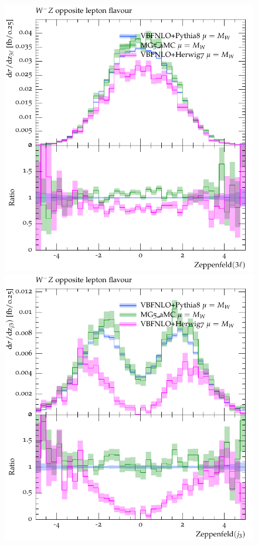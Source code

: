 \documentclass[11pt]{cernrep}
\begin{document}
\begin{figure}[htbp]
\begin{center}
   \includegraphics[scale=0.5]{figs/VBFNLO_WmZ_OF_zep3l}
   \includegraphics[scale=0.5]{figs/VBFNLO_WmZ_OF_zepj3}

\end{center}
\end{figure}
\end{document}
